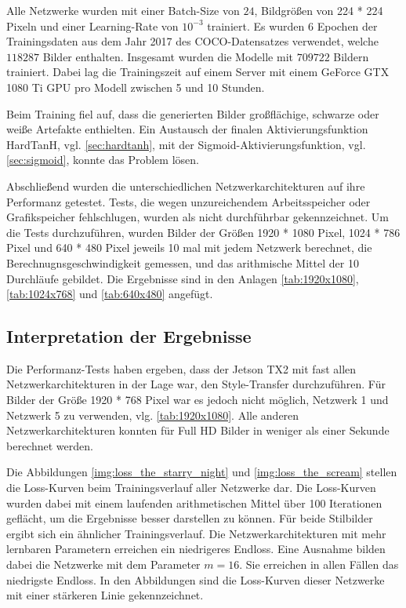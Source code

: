 Alle Netzwerke wurden mit einer Batch-Size von $ 24 $, Bildgrößen von 224 * 224 Pixeln und einer Learning-Rate von $ 10^{-3} $ trainiert. Es wurden 6 Epochen der Trainingsdaten aus dem Jahr 2017 des COCO-Datensatzes verwendet, welche $ 118287 $ Bilder enthalten. Insgesamt wurden die Modelle mit $ 709722 $ Bildern trainiert. Dabei lag die Trainingszeit auf einem Server mit einem GeForce GTX 1080 Ti GPU pro Modell zwischen 5 und 10 Stunden.

Beim Training fiel auf, dass die generierten Bilder großflächige, schwarze oder weiße Artefakte enthielten. Ein Austausch der finalen Aktivierungsfunktion HardTanH, vgl. \ref{sec:hardtanh}, mit der Sigmoid-Aktivierungsfunktion, vgl. \ref{sec:sigmoid}, konnte das Problem lösen.

Abschließend wurden die unterschiedlichen Netzwerkarchitekturen auf ihre Performanz getestet. Tests, die wegen unzureichendem Arbeitsspeicher oder Grafikspeicher fehlschlugen, wurden als \textcolor{danger}{nicht durchführbar} gekennzeichnet. Um die Tests durchzuführen, wurden Bilder der Größen 1920 * 1080 Pixel, 1024 * 786 Pixel und 640 * 480 Pixel jeweils 10 mal mit jedem Netzwerk berechnet, die Berechnugnsgeschwindigkeit gemessen, und das arithmische Mittel der 10 Durchläufe gebildet. Die Ergebnisse sind in den Anlagen \ref{tab:1920x1080}, \ref{tab:1024x768} und \ref{tab:640x480} angefügt.

\subsection{Interpretation der Ergebnisse}

Die Performanz-Tests haben ergeben, dass der Jetson TX2 mit fast allen Netzwerkarchitekturen in der Lage war, den Style-Transfer durchzuführen. Für Bilder der Größe 1920 * 768 Pixel war es jedoch nicht möglich, Netzwerk 1 und Netzwerk 5 zu verwenden, vlg. \ref{tab:1920x1080}. Alle anderen Netzwerkarchitekturen konnten für Full HD Bilder in weniger als einer Sekunde berechnet werden.

Die Abbildungen \ref{img:loss_the_starry_night} und \ref{img:loss_the_scream} stellen die Loss-Kurven beim Trainingsverlauf aller Netzwerke dar. Die Loss-Kurven wurden dabei mit einem laufenden arithmetischen Mittel über 100 Iterationen geflächt, um die Ergebnisse besser darstellen zu können. Für beide Stilbilder ergibt sich ein ähnlicher Trainingsverlauf. Die Netzwerkarchitekturen mit mehr lernbaren Parametern erreichen ein niedrigeres Endloss. Eine Ausnahme bilden dabei die Netzwerke mit dem Parameter $ m = 16 $. Sie erreichen in allen Fällen das niedrigste Endloss. In den Abbildungen sind die Loss-Kurven dieser Netzwerke mit einer stärkeren Linie gekennzeichnet.

